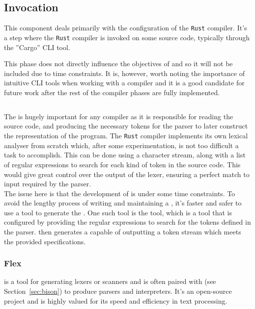 \subsection{Invocation}

This component deals primarily with the configuration of the \texttt{Rust} compiler. It's a
step where the \texttt{Rust} compiler is invoked on some source code, typically through the
''Cargo'' CLI tool\cite{RUST-COMPILER}. 

This phase does not directly influence the objectives of \lang{} and so it will not
be included due to time constraints. It is, however, worth noting the importance of
intuitive CLI tools when working with a compiler and it is a good candidate for
future work after the rest of the compiler phases are fully implemented.

\subsection{\lexer{}}

The \lexer{} is hugely important for any compiler as it is responsible for
reading the source code, and producing the necessary tokens for the parser to later
construct the \ast{} representation of the program. The \texttt{Rust} compiler implements its
own lexical analyser from scratch which, after some experimentation, is not too
difficult a task to accomplish. This can be done using a character stream, along
with a list of regular expressions to search for each kind of token in the source
code. This would give great control over the output of the lexer, ensuring a perfect
match to input required by the parser. \\

The issue here is that the development of \lang{} is under some time constraints. 
To avoid the lengthy process of writing and maintaining a \lexer{},
it's faster and safer to use a tool to generate the \lexer{}. One such tool is the
\lexerGen{} tool, which is a tool that is configured by providing the regular
expressions to search for the tokens defined in the parser. \lexerGen{} then
generates a \lexer{} capable of outputting a token stream which meets the provided
specifications. 

\subsubsection{Flex}

\lexerGen{} is a tool for generating lexers or scanners and is often paired with
\parserGen{} (see Section~\ref{sec:bison}) to produce parsers and interpreters.
It's an open-source project and is highly valued for its speed and efficiency in text
processing. \\

